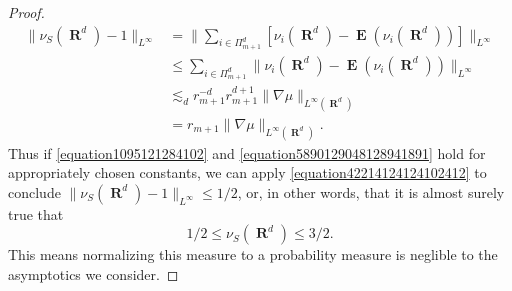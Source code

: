 \documentclass[12pt,reqno]{amsart}
\DeclareMathOperator{\RR}{\mathbf{R}}
\DeclareMathOperator{\EE}{\mathbf{E}}
\begin{document}
\begin{proof}
\begin{equation}
	\begin{split}
		\| \nu_S(\RR^d) - 1 \|_{L^\infty} &= \| \sum\nolimits_{i \in \Pi_{m+1}^d} \left[ \nu_i(\RR^d) - \EE(\nu_i(\RR^d)) \right] \|_{L^\infty} \\
		&\leq \sum\nolimits_{i \in \Pi_{m+1}^d} \| \nu_i(\RR^d) - \EE(\nu_i(\RR^d)) \|_{L^\infty}\\
		&\lesssim_d r_{m+1}^{-d} r_{m+1}^{d+1} \| \nabla \mu \|_{L^\infty(\RR^d)}\\
		&= r_{m+1} \| \nabla \mu \|_{L^\infty(\RR^d)}.
	\end{split}
	\end{equation}	
    Thus if \eqref{equation1095121284102} and \eqref{equation5890129048128941891} hold for appropriately chosen constants, we can apply \eqref{equation42214124124102412} to conclude $\| \nu_S(\RR^d) - 1 \|_{L^\infty} \leq 1/2$, or, in other words, that it is almost surely true that
    \begin{equation} \label{equation86912904129041290}
        1/2 \leq \nu_S(\RR^d) \leq 3/2.
    \end{equation}
    This means normalizing this measure to a probability measure is neglible to the asymptotics we consider.


\end{proof}
\end{document}
